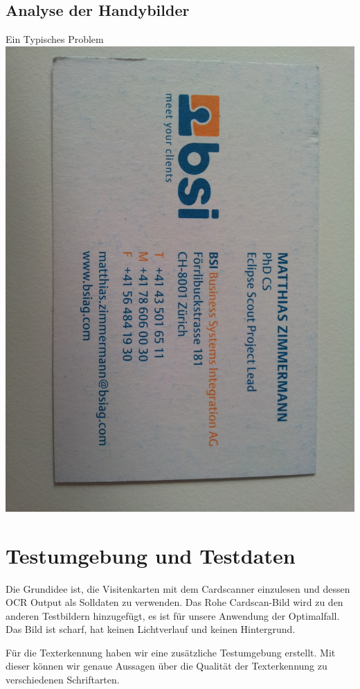\documentclass[10pt]{article}
\begin{document}
\subsection{Analyse der Handybilder}
Ein Typisches Problem
\includegraphics[scale= 0.05]{MZimmermann.jpg}


\section{Testumgebung und Testdaten}

Die Grundidee ist, die Visitenkarten mit dem Cardscanner einzulesen und dessen OCR Output als Solldaten zu verwenden. 
Das Rohe Cardscan-Bild wird zu den anderen Testbildern hinzugefügt, es ist für unsere Anwendung der Optimalfall. Das Bild ist scharf, hat keinen Lichtverlauf und keinen Hintergrund.

Für die Texterkennung haben wir eine zusätzliche Testumgebung erstellt. Mit dieser können wir genaue Aussagen über die Qualität der Texterkennung zu verschiedenen Schriftarten.
 
\end{document}
